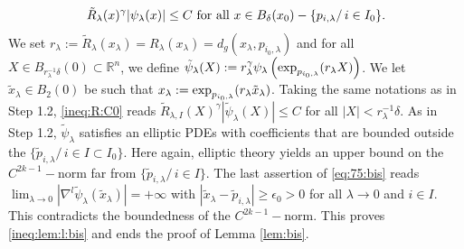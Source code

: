 \documentclass[reqno]{amsart}
\def \rn {\mathbb{R}^n}
\begin{document}
\begin{equation}\label{ineq:R:C0}
\tilde{R}_\lambda(x )^{\gamma }| \psi_\lambda(x )|\leq C\hbox{ for all }x\in B_{\delta}(x_0)-\{p_{i,\lambda}/\, i\in I_0\}.
\end{equation}
We set $r_\lambda:=\tilde{R}_\lambda(x_\lambda)=R_\lambda(x_\lambda)=d_g(x_\lambda, p_{i_0,\lambda})$ and for all $X\in B_{r_\lambda^{-1}\delta}(0)\subset\rn$, we define $\tilde{\psi}_\lambda(X):=r_\lambda^\gamma \psi_\lambda\left(\hbox{exp}_{p_{i_0,\lambda}}(r_\lambda X)\right)$. We let $\tilde{x}_\lambda\in B_2(0)$ be such that $x_\lambda:=\hbox{exp}_{p_{i_0,\lambda}}(r_\lambda \tilde{x}_\lambda)$. Taking the same notations as in Step 1.2, \eqref{ineq:R:C0} reads $\tilde{R}_{\lambda, I}(X)^{\gamma }| \tilde{\psi}_\lambda(X )|\leq C$ for all $|X|<r_\lambda^{-1}\delta$. As in Step 1.2, $\tilde{\psi}_\lambda$ satisfies an elliptic PDEs with coefficients that are bounded outside the $\{\tilde{p}_{i,\lambda}/\, i\in I\subset I_0\}$. Here again, elliptic theory yields an upper bound on the $C^{2k-1}-$norm far from $\{\tilde{p}_{i,\lambda}/\, i\in I\}$. The last assertion of \eqref{eq:75:bis} reads $\lim_{\lambda\to 0}|\nabla^l\tilde{\psi}_\lambda(\tilde{x}_\lambda)|=+\infty$ with $|\tilde{x}_\lambda-\tilde{p}_{i,\lambda}|\geq \epsilon_0>0$ for all $\lambda\to 0$ and $i\in I$. This contradicts the boundedness of the $C^{2k-1}-$norm.  This proves \eqref{ineq:lem:l:bis} and ends the proof of Lemma \ref{lem:bis}.
\end{document}
